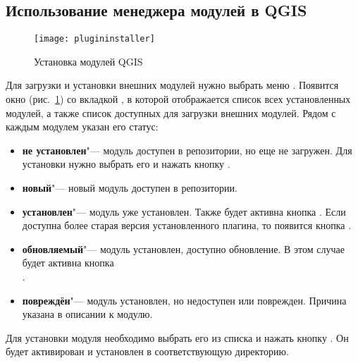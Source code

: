 \subsection{Использование менеджера модулей в QGIS}\label{sec:python_plugin_installer}

\begin{figure}[ht]
   \centering
   \texttt{[image: plugininstaller]}
   \caption{Установка модулей QGIS \nixcaption}\label{fig:plugininstaller}\smallskip
\end{figure}

Для загрузки и установки внешних модулей нужно выбрать меню
 \arrow {}.
Появится окно 
(рис.~\ref{fig:plugininstaller}) со вкладкой , в которой
отображается список всех установленных модулей, а также список доступных
для загрузки внешних модулей. Рядом с каждым модулем указан его статус:
\begin{itemize}[label=--]
\item \textbf{не установлен}"--- модуль доступен в репозитории, но еще
не загружен. Для установки нужно выбрать его и нажать кнопку
.
\item \textbf{новый}"--- новый модуль доступен в репозитории.
\item \textbf{установлен}"--- модуль уже установлен. Также будет
активна кнопка . Если доступна более
старая версия установленного плагина, то появится кнопка
.
\item \textbf{обновляемый}"--- модуль установлен, доступно обновление.
В этом случае будет активна кнопка \\
.
\item \textbf{повреждён}"--- модуль установлен, но недоступен или
поврежден. Причина указана в описании к модулю.
\end{itemize}


Для установки модуля необходимо выбрать его из списка и нажать кнопку
. Он будет активирован и установлен в
соответствующую директорию.

